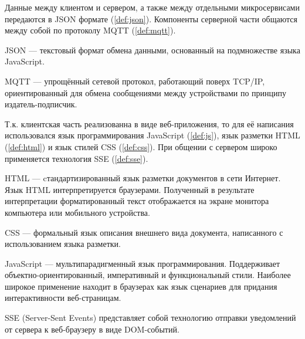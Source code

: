 \noindent Данные между клиентом и сервером, а также между отдельными микросервисами передаются в JSON формате
(\ref{def:json}). Компоненты серверной части общаются между собой по протоколу MQTT (\ref{def:mqtt}).

\begin{definition}
    \label{def:json}
    JSON — текстовый формат обмена данными, основанный на подмножестве языка JavaScript.
\end{definition}

\begin{definition}
    \label{def:mqtt}
    MQTT — упрощённый сетевой протокол, работающий поверх TCP/IP, ориентированный для обмена сообщениями между устройствами
    по принципу издатель-подписчик. 
\end{definition}

\noindent Т.к. клиентская часть реализованна в виде веб-приложения, то для её написания использовался язык программирования
JavaScript (\ref{def:js}), язык разметки HTML (\ref{def:html}) и язык стилей CSS (\ref{def:css}). При общении с сервером
широко применяется технология SSE (\ref{def:sse}).

\begin{definition}
    \label{def:html}
    HTML — cтандартизированный язык разметки документов в сети Интернет.
    Язык HTML интерпретируется браузерами. Полученный в результате интерпретации форматированный текст
    отображается на экране монитора компьютера или мобильного устройства.
\end{definition}

\begin{definition}
    \label{def:css}
    CSS — формальный язык описания внешнего вида документа, написанного с использованием языка разметки.
\end{definition}

\begin{definition}
    \label{def:js}
    JavaScript — мультипарадигменный язык программирования. Поддерживает объектно-ориентированный, императивный и
    функциональный стили. Наиболее широкое применение находит в браузерах как язык сценариев для придания интерактивности
    веб-страницам.
\end{definition}

\begin{definition}
    \label{def:sse}
    SSE (Server-Sent Events) представляет собой технологию отправки уведомлений от сервера к веб-браузеру в виде DOM-событий.
\end{definition}

